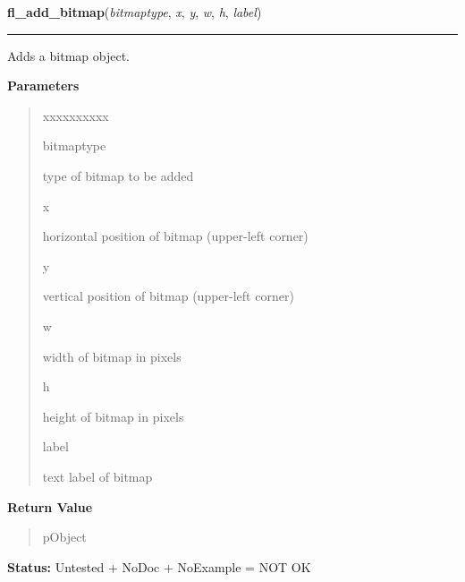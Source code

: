     \label{xformslib:library:fl_add_bitmap}

    \vspace{0.5ex}

\hspace{.8\funcindent}\begin{boxedminipage}{\funcwidth}

    \raggedright \textbf{fl\_add\_bitmap}(\textit{bitmaptype}, \textit{x}, \textit{y}, \textit{w}, \textit{h}, \textit{label})

    \vspace{-1.5ex}

    \rule{\textwidth}{0.5\fboxrule}
\setlength{\parskip}{2ex}
    Adds a bitmap object.

\setlength{\parskip}{1ex}
      \textbf{Parameters}
      \vspace{-1ex}

      \begin{quote}
        \begin{Ventry}{xxxxxxxxxx}

          \item[bitmaptype]

          type of bitmap to be added

          \item[x]

          horizontal position of bitmap (upper-left corner)

          \item[y]

          vertical position of bitmap (upper-left corner)

          \item[w]

          width of bitmap in pixels

          \item[h]

          height of bitmap in pixels

          \item[label]

          text label of bitmap

        \end{Ventry}

      \end{quote}

      \textbf{Return Value}
    \vspace{-1ex}

      \begin{quote}
      pObject

      \end{quote}

\textbf{Status:} Untested + NoDoc + NoExample = NOT OK



    \end{boxedminipage}

